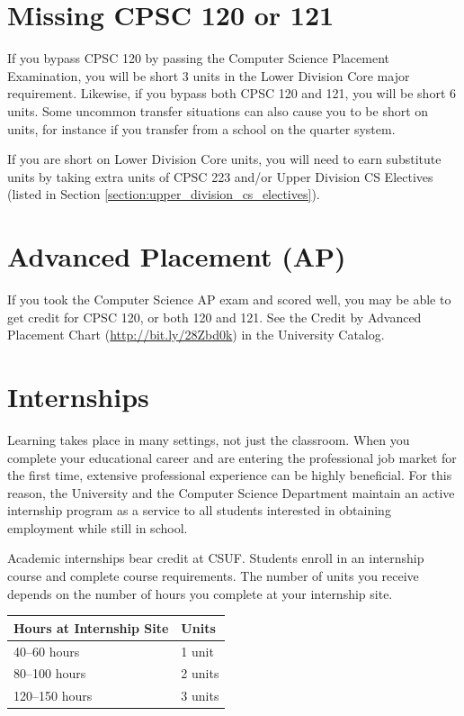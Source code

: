\documentclass{book}
\newcommand{\CampusName}{CSUF}
\begin{document}
\section{Missing CPSC 120 or 121}

If you bypass CPSC 120 by passing the Computer Science Placement Examination, you will be short 3 units in the Lower Division Core major requirement. Likewise, if you bypass both CPSC 120 and 121, you will be short 6 units. Some uncommon transfer situations can also cause you to be short on units, for instance if you transfer from a school on the quarter system.

If you are short on Lower Division Core units, you will need to earn substitute units by
taking extra units of CPSC 223 and/or Upper Division CS Electives (listed in Section
\ref{section:upper_division_cs_electives}).


\section{Advanced Placement (AP)}
\label{section:ap}
If you took the Computer Science AP exam and scored well, you may be able to get credit for CPSC 120, or both 120 and 121. See the Credit by Advanced Placement Chart (\url{http://bit.ly/28Zbd0k}) in the University Catalog.

\section{Internships}

Learning takes place in many settings, not just the classroom. When you complete your educational career and are entering the professional job market for the first time, extensive professional experience can be highly beneficial. For this reason, the University and the Computer Science Department maintain an active internship program as a service to all students interested in obtaining employment while still in school.

Academic internships bear credit at \CampusName. Students enroll in an internship course and complete course requirements. The number of units you receive depends on the number of hours you complete at your internship site.

\begin{center}
\begin{tabular}{|l|l|} \hline
  \textbf{Hours at Internship Site} & \textbf{Units} \\ \hline
  40--60 hours & 1 unit \\ \hline
  80--100 hours & 2 units \\ \hline
  120--150 hours & 3 units \\ \hline
\end{tabular}
\end{center}
\end{document}
